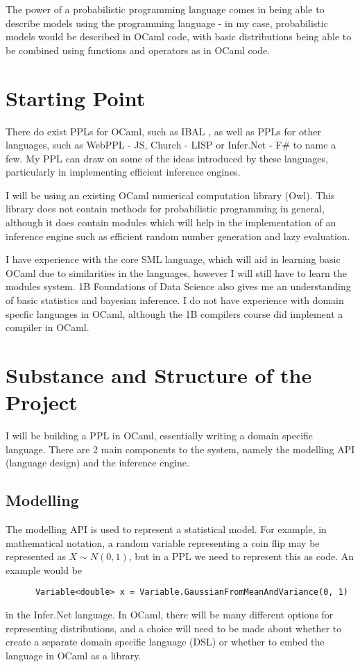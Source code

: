 The power of a probabilistic programming language comes in being able to describe models using the programming language - in my case, probabilistic models would be described in OCaml code, with basic distributions being able to be combined using functions and operators as in OCaml code.

\section*{Starting Point}

There do exist PPLs for OCaml, such as IBAL \cite{kiselyov2009embedded}, as well as PPLs for other languages, such as WebPPL - JS\cite{mobus2018structure}, Church - LISP\cite{goodman2012church} or Infer.Net - F\#\cite{wang2011using} to name a few. My PPL can draw on some of the ideas introduced by these languages, particularly in implementing efficient inference engines.

I will be using an existing OCaml numerical computation library (Owl). This library does not contain methods for probabilistic programming in general, although it does contain modules which will help in the implementation of an inference engine such as efficient random number generation and lazy evaluation.

I have experience with the core SML language, which will aid in learning basic OCaml due to similarities in the languages, however I will still have to learn the modules system. 1B Foundations of Data Science also gives me an understanding of basic statistics and bayesian inference. I do not have experience with domain specfic languages in OCaml, although the 1B compilers course did implement a compiler in OCaml.

\section*{Substance and Structure of the Project}

I will be building a PPL in OCaml, essentially writing a domain specific language. There are 2 main components to the system, namely the modelling API (language design) and the inference engine.

\subsection*{Modelling}
The modelling API is used to represent a statistical model. For example, in mathematical notation, a random variable representing a coin flip may be represented as $X \sim N(0,1)$, but in a PPL we need to represent this as code. An example would be
\begin{verbatim}
      Variable<double> x = Variable.GaussianFromMeanAndVariance(0, 1)
\end{verbatim}
in the Infer.Net language. In OCaml, there will be many different options for representing distributions, and a choice will need to be made about whether to create a separate domain specific language (DSL) or whether to embed the language in OCaml as a library. 

